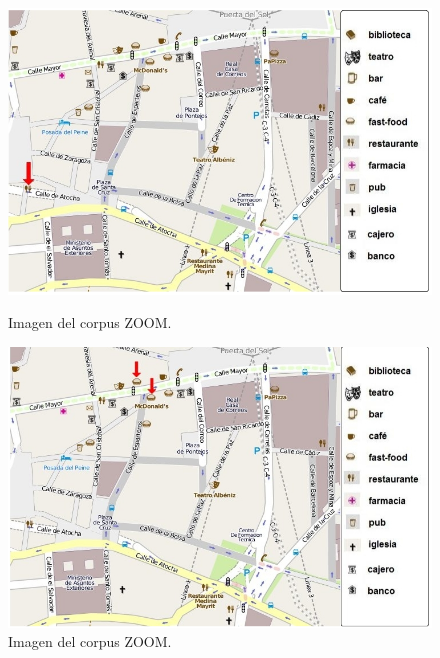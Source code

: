 \begin{figure}
\begin{minipage}[b]{0.5\linewidth}
\centering
\includegraphics[width=\textwidth]{images/corpus/mapa7.png}
\caption{Imagen del corpus ZOOM.}
\label{mapa7}
\end{minipage}
\hspace*{0cm}
\begin{minipage}[b]{0.5\linewidth}
\centering
\includegraphics[width=\textwidth]{images/corpus/mapa8.png}
\caption{Imagen del corpus ZOOM.}
\label{mapa8}
\end{minipage}
\end{figure}

